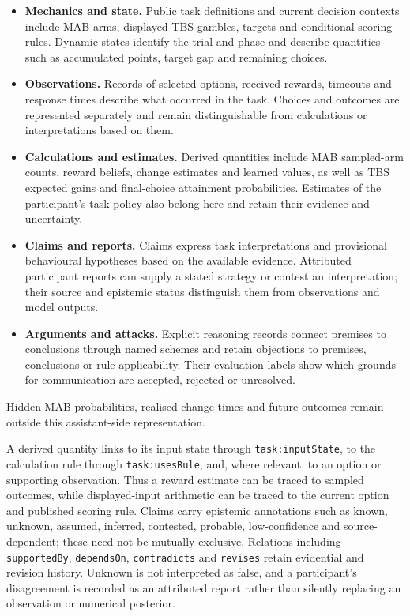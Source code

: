 \documentclass[11pt,a4paper]{article}
\begin{document}
\begin{itemize}
  \item \textbf{Mechanics and state.} Public task definitions and current decision contexts include MAB arms, displayed TBS gambles, targets and conditional scoring rules. Dynamic states identify the trial and phase and describe quantities such as accumulated points, target gap and remaining choices.
  \item \textbf{Observations.} Records of selected options, received rewards, timeouts and response times describe what occurred in the task. Choices and outcomes are represented separately and remain distinguishable from calculations or interpretations based on them.
  \item \textbf{Calculations and estimates.} Derived quantities include MAB sampled-arm counts, reward beliefs, change estimates and learned values, as well as TBS expected gains and final-choice attainment probabilities. Estimates of the participant's task policy also belong here and retain their evidence and uncertainty.
  \item \textbf{Claims and reports.} Claims express task interpretations and provisional behavioural hypotheses based on the available evidence. Attributed participant reports can supply a stated strategy or contest an interpretation; their source and epistemic status distinguish them from observations and model outputs.
  \item \textbf{Arguments and attacks.} Explicit reasoning records connect premises to conclusions through named schemes and retain objections to premises, conclusions or rule applicability. Their evaluation labels show which grounds for communication are accepted, rejected or unresolved.
\end{itemize}
Hidden MAB probabilities, realised change times and future outcomes remain outside this assistant-side representation.



A derived quantity links to its input state through \texttt{task:inputState}, to the calculation rule through \texttt{task:usesRule}, and, where relevant, to an option or supporting observation. Thus a reward estimate can be traced to sampled outcomes, while displayed-input arithmetic can be traced to the current option and published scoring rule. Claims carry epistemic annotations such as known, unknown, assumed, inferred, contested, probable, low-confidence and source-dependent; these need not be mutually exclusive. Relations including \texttt{supportedBy}, \texttt{dependsOn}, \texttt{contradicts} and \texttt{revises} retain evidential and revision history. Unknown is not interpreted as false, and a participant's disagreement is recorded as an attributed report rather than silently replacing an observation or numerical posterior.
\end{document}
